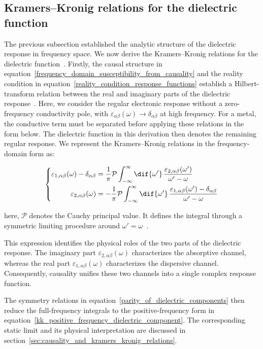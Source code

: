 \subsection{Kramers--Kronig relations for the dielectric function}

The previous subsection established the analytic structure of the dielectric response in frequency space.
We now derive the Kramers--Kronig relations for the dielectric function~\cite{toll1956causality}.
Firstly, the causal structure in equation~\eqref{frequency_domain_susceptibility_from_causality} and the reality condition in equation~\eqref{reality_condition_response_functions}
establish a Hilbert-transform relation between the real and imaginary parts of the dielectric response~\cite{stefanski2022analytical,koutserimpas2024time,franta2020symmetry}.
Here, we consider the regular electronic response without a zero-frequency conductivity pole,
with $\varepsilon_{\alpha\beta}(\omega)\to\delta_{\alpha\beta}$ at high frequency.
For a metal, the conductive term must be separated before applying these relations in the form below.
The dielectric function in this derivation then denotes the remaining regular response.
We represent the Kramers--Kronig relations in the frequency-domain form as:

\begin{equation}
\left\{\begin{aligned}
    \varepsilon_{1,\alpha\beta}(\omega)-\delta_{\alpha\beta} &=
    \frac{1}{\pi}\mathcal{P}
    \int_{-\infty}^{\infty}\dif{\omega'}\,
    \frac{\varepsilon_{2,\alpha\beta}(\omega')}{\omega'-\omega} \\
\varepsilon_{2,\alpha\beta}(\omega) &=
    -\frac{1}{\pi}\mathcal{P}
    \int_{-\infty}^{\infty}\dif{\omega'}\,
    \frac{\varepsilon_{1,\alpha\beta}(\omega')-\delta_{\alpha\beta}}{\omega'-\omega}
\end{aligned}\right.
\label{kk_general_dielectric_tensor}
\end{equation}

here, $\mathcal{P}$ denotes the Cauchy principal value.
It defines the integral through a symmetric limiting procedure around $\omega'=\omega$~\cite{stefanski2022analytical,koutserimpas2024time}.

This expression identifies the physical roles of the two parts of the dielectric response.
The imaginary part $\varepsilon_{2,\alpha\beta}(\omega)$ characterizes the absorptive channel, 
whereas the real part $\varepsilon_{1,\alpha\beta}(\omega)$ characterizes the dispersive channel.
Consequently, causality unifies these two channels into a single complex response function.

The symmetry relations in equation~\eqref{parity_of_dielectric_components} then reduce the full-frequency integrals to the positive-frequency form in equation~\eqref{kk_positive_frequency_dielectric_component}.
The corresponding static limit and its physical interpretation are discussed in section~\ref{sec:causality_and_kramers_kronig_relations}.
